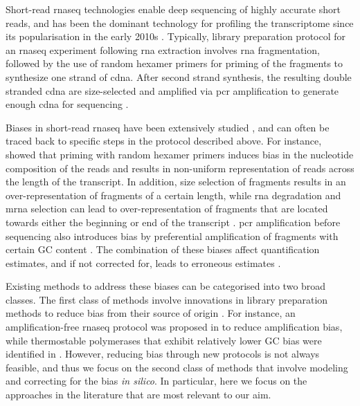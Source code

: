 Short-read \gls{rnaseq} technologies enable deep sequencing of highly accurate short reads, and has been the dominant technology for profiling the transcriptome since its popularisation in the early 2010s \cite{Lowe2017}. Typically, library preparation protocol for an \gls{rnaseq} experiment following \gls{rna} extraction involves \gls{rna} fragmentation, followed by the use of random hexamer primers for priming of the fragments to synthesize one strand of \gls{cdna}. After second strand synthesis, the resulting double stranded \gls{cdna} are size-selected and amplified via \gls{pcr} amplification to generate enough \gls{cdna} for sequencing \cite{Marguerat2010}.  

Biases in short-read \gls{rnaseq} have been extensively studied \cite{Hansen2010, Li2010, Li2011, Zhengpeng2010, Roberts2011, Benjamini2012, Lahens2014, Love2016}, and can often be traced back to specific steps in the protocol described above. For instance, \cite{Hansen2010} showed that priming with random hexamer primers induces bias in the nucleotide composition of the reads and results in non-uniform representation of reads across the length of the transcript. In addition, size selection of fragments results in an over-representation of fragments of a certain length, while \gls{rna} degradation and \gls{mrna} selection can lead to over-representation of fragments that are located towards either the beginning or end of the transcript \cite{Roberts2011, Lahens2014, Love2016}. \gls{pcr} amplification before sequencing also introduces bias by preferential amplification of fragments with certain GC content \cite{Benjamini2012, Love2016}. The combination of these biases affect quantification estimates, and if not corrected for, leads to erroneous estimates \cite{Roberts2011, Love2016}. 

Existing methods to address these biases can be categorised into two broad classes. The first class of methods involve innovations in library preparation methods to reduce bias from their source of origin \cite{Vandijk2014}. For instance, an amplification-free \gls{rnaseq} protocol was proposed in \cite{Mamanova2010} to reduce amplification bias, while thermostable polymerases that exhibit relatively lower GC bias were identified in \cite{Quail2012}. However, reducing bias through new protocols is not always feasible, and thus we focus on the second class of methods that involve modeling and correcting for the bias \textit{in silico}. In particular, here we focus on the approaches in the literature that are most relevant to our aim. 

